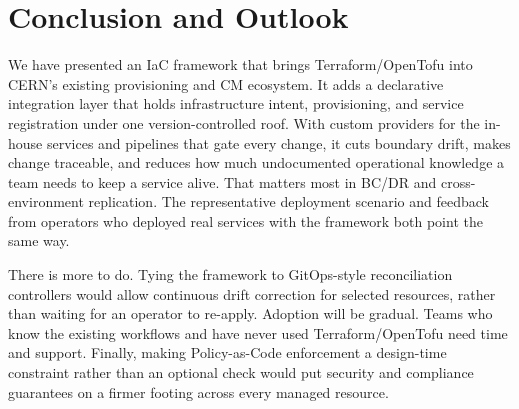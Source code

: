 \section{Conclusion and Outlook}\label{conclusion}

We have presented an IaC framework that brings Terraform/OpenTofu into CERN's existing provisioning and CM ecosystem. It adds a declarative integration layer that holds infrastructure intent, provisioning, and service registration under one version-controlled roof. With custom providers for the in-house services and pipelines that gate every change, it cuts boundary drift, makes change traceable, and reduces how much undocumented operational knowledge a team needs to keep a service alive. That matters most in BC/DR and cross-environment replication. The representative deployment scenario and feedback from operators who deployed real services with the framework both point the same way. 

There is more to do. Tying the framework to GitOps-style reconciliation controllers would allow continuous drift correction for selected resources, rather than waiting for an operator to re-apply. Adoption will be gradual. Teams who know the existing workflows and have never used Terraform/OpenTofu need time and support. Finally, making Policy-as-Code enforcement a design-time constraint rather than an optional check would put security and compliance guarantees on a firmer footing across every managed resource.
